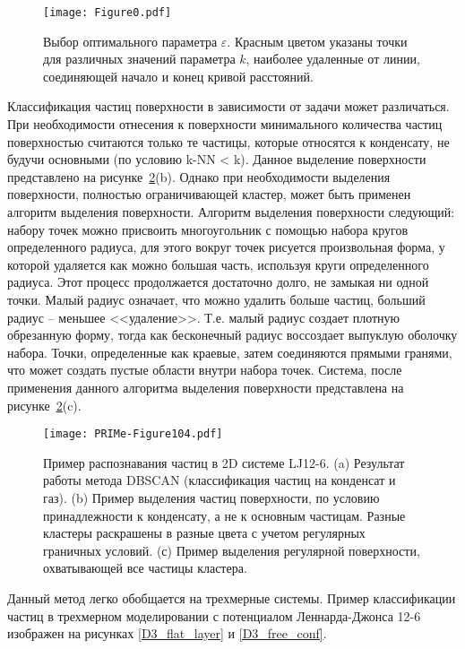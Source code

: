 \begin{figure}[!t]
    \centering
    \texttt{[image: Figure0.pdf]}
    \caption{Выбор оптимального параметра $\varepsilon$.
    Красным цветом указаны точки для различных значений параметра $k$, наиболее удаленные от линии, соединяющей начало и конец кривой расстояний.}
    \label{epsilon_k}
\end{figure}

Классификация частиц поверхности в зависимости от задачи может различаться.
При необходимости отнесения к поверхности минимального количества частиц поверхностью считаются только те частицы, которые относятся к конденсату, не будучи основными (по условию k-NN < k).
Данное выделение поверхности представлено на рисунке~\ref{DBSCAN-Illustr}(b).
Однако при необходимости выделения поверхности, полностью ограничивающей кластер, может быть применен алгоритм выделения поверхности.
Алгоритм выделения поверхности следующий: набору точек можно присвоить многоугольник с помощью набора кругов определенного радиуса, для этого вокруг точек рисуется произвольная форма, у которой удаляется как можно большая часть, используя круги определенного радиуса.
Этот процесс продолжается достаточно долго, не замыкая ни одной точки.
Малый радиус означает, что можно удалить больше частиц, больший радиус -- меньшее <<удаление>>.
Т.е. малый радиус создает плотную обрезанную форму, тогда как бесконечный радиус воссоздает выпуклую оболочку набора.
Точки, определенные как краевые, затем соединяются прямыми гранями, что может создать пустые области внутри набора точек.
Система, после применения данного алгоритма выделения поверхности представлена на рисунке~\ref{DBSCAN-Illustr}(c).

\begin{figure}[!t]
    \centering
    \texttt{[image: PRIMe-Figure104.pdf]}
    \caption{Пример распознавания частиц в 2D системе LJ12-6. 
    (a) Результат работы метода DBSCAN (классификация частиц на конденсат и газ). 
    (b) Пример выделения частиц поверхности, по условию принадлежности к конденсату, а не к основным частицам.
    Разные кластеры раскрашены в разные цвета с учетом регулярных граничных условий. 
    (с) Пример выделения регулярной поверхности, охватывающей все частицы кластера.}
    \label{DBSCAN-Illustr}
\end{figure}

Данный метод легко обобщается на трехмерные системы.
Пример классификации частиц в трехмерном моделировании с потенциалом Леннарда-Джонса 12-6 изображен на рисунках \ref{D3_flat_layer} и \ref{D3_free_conf}.

